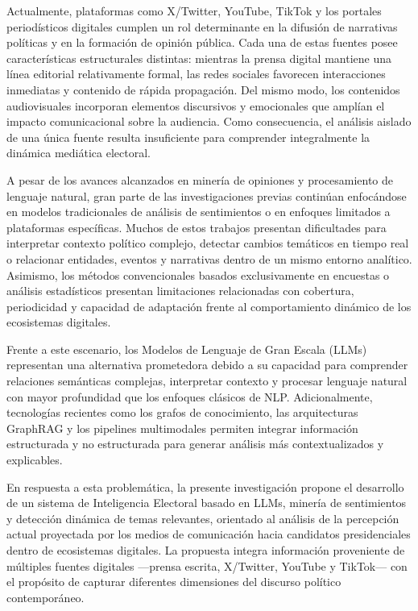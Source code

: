 Actualmente, plataformas como X/Twitter, YouTube, TikTok y los portales periodísticos digitales cumplen un rol determinante en la difusión de narrativas políticas y en la formación de opinión pública. Cada una de estas fuentes posee características estructurales distintas: mientras la prensa digital mantiene una línea editorial relativamente formal, las redes sociales favorecen interacciones inmediatas y contenido de rápida propagación. Del mismo modo, los contenidos audiovisuales incorporan elementos discursivos y emocionales que amplían el impacto comunicacional sobre la audiencia. Como consecuencia, el análisis aislado de una única fuente resulta insuficiente para comprender integralmente la dinámica mediática electoral.

A pesar de los avances alcanzados en minería de opiniones y procesamiento de lenguaje natural, gran parte de las investigaciones previas continúan enfocándose en modelos tradicionales de análisis de sentimientos o en enfoques limitados a plataformas específicas. Muchos de estos trabajos presentan dificultades para interpretar contexto político complejo, detectar cambios temáticos en tiempo real o relacionar entidades, eventos y narrativas dentro de un mismo entorno analítico. Asimismo, los métodos convencionales basados exclusivamente en encuestas o análisis estadísticos presentan limitaciones relacionadas con cobertura, periodicidad y capacidad de adaptación frente al comportamiento dinámico de los ecosistemas digitales.

Frente a este escenario, los Modelos de Lenguaje de Gran Escala (LLMs) representan una alternativa prometedora debido a su capacidad para comprender relaciones semánticas complejas, interpretar contexto y procesar lenguaje natural con mayor profundidad que los enfoques clásicos de NLP. Adicionalmente, tecnologías recientes como los grafos de conocimiento, las arquitecturas GraphRAG y los pipelines multimodales permiten integrar información estructurada y no estructurada para generar análisis más contextualizados y explicables.

En respuesta a esta problemática, la presente investigación propone el desarrollo de un sistema de Inteligencia Electoral basado en LLMs, minería de sentimientos y detección dinámica de temas relevantes, orientado al análisis de la percepción actual proyectada por los medios de comunicación hacia candidatos presidenciales dentro de ecosistemas digitales. La propuesta integra información proveniente de múltiples fuentes digitales —prensa escrita, X/Twitter, YouTube y TikTok— con el propósito de capturar diferentes dimensiones del discurso político contemporáneo.

